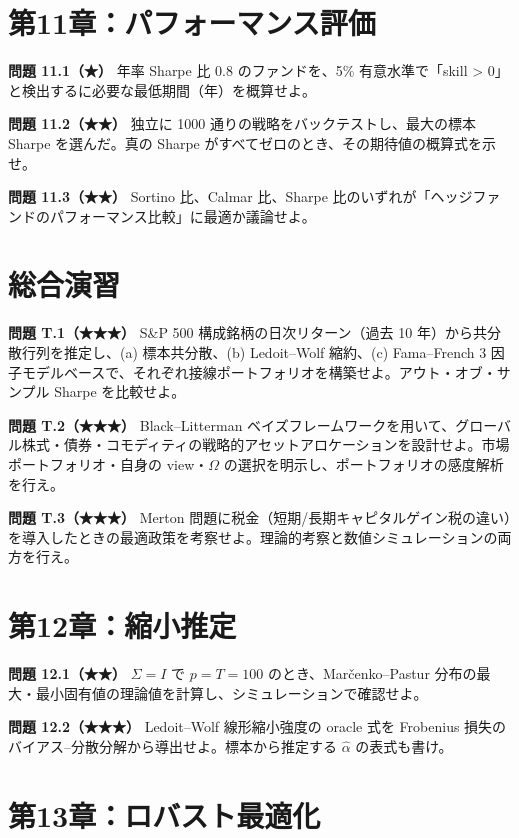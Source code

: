 \documentclass[11pt,a4paper]{report}
\begin{document}
\section{第11章：パフォーマンス評価}

\textbf{問題 11.1（★）} 年率 Sharpe 比 0.8 のファンドを、5\% 有意水準で「skill > 0」と検出するに必要な最低期間（年）を概算せよ。

\textbf{問題 11.2（★★）} 独立に 1000 通りの戦略をバックテストし、最大の標本 Sharpe を選んだ。真の Sharpe がすべてゼロのとき、その期待値の概算式を示せ。

\textbf{問題 11.3（★★）} Sortino 比、Calmar 比、Sharpe 比のいずれが「ヘッジファンドのパフォーマンス比較」に最適か議論せよ。

\section{総合演習}

\textbf{問題 T.1（★★★）} S\&P 500 構成銘柄の日次リターン（過去 10 年）から共分散行列を推定し、(a) 標本共分散、(b) Ledoit–Wolf 縮約、(c) Fama–French 3 因子モデルベースで、それぞれ接線ポートフォリオを構築せよ。アウト・オブ・サンプル Sharpe を比較せよ。

\textbf{問題 T.2（★★★）} Black–Litterman ベイズフレームワークを用いて、グローバル株式・債券・コモディティの戦略的アセットアロケーションを設計せよ。市場ポートフォリオ・自身の view・$\Omega$ の選択を明示し、ポートフォリオの感度解析を行え。

\textbf{問題 T.3（★★★）} Merton 問題に税金（短期/長期キャピタルゲイン税の違い）を導入したときの最適政策を考察せよ。理論的考察と数値シミュレーションの両方を行え。

\section{第12章：縮小推定}

\textbf{問題 12.1（★★）} $\Sigma = I$ で $p = T = 100$ のとき、Marčenko–Pastur 分布の最大・最小固有値の理論値を計算し、シミュレーションで確認せよ。

\textbf{問題 12.2（★★★）} Ledoit–Wolf 線形縮小強度の oracle 式を Frobenius 損失のバイアス–分散分解から導出せよ。標本から推定する $\hat\alpha$ の表式も書け。

\section{第13章：ロバスト最適化}
\end{document}
